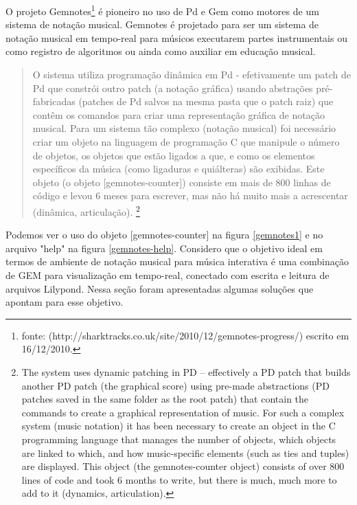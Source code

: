 \documentclass[draft]{ppgmus}
\begin{document}
O projeto Gemnotes\footnote{fonte: (http://sharktracks.co.uk/site/2010/12/gemnotes-progress/) escrito em 16/12/2010.} 
\cite{gemnotes} é pioneiro no uso de Pd e Gem como motores de um sistema de notação musical.
Gemnotes é projetado para ser um sistema de notação musical em tempo-real para músicos executarem partes instrumentais
ou como registro de algoritmos ou ainda como auxiliar em educação musical.

\begin{quote}
O sistema utiliza programação dinâmica em Pd - efetivamente um patch de Pd que constrói outro patch (a notação gráfica)
usando abstrações pré-fabricadas (patches de Pd salvos na mesma pasta que o patch raiz) que contêm os comandos para
criar uma representação gráfica de notação musical. Para um sistema tão complexo (notação musical) foi necessário
criar um objeto na linguagem de programação C que manipule o número de objetos, os objetos que estão ligados a que,
e como os elementos específicos da música (como ligaduras e quiálteras) são exibidas. Este objeto (o objeto [gemnotes-counter])
consiste em mais de 800 linhas de código e levou 6 meses para escrever, mas não há muito mais a acrescentar
(dinâmica, articulação). \cite{gemnotes} \footnote{The system uses dynamic patching in PD – effectively a PD patch that builds another PD patch (the graphical score) 
using pre-made abstractions (PD patches saved in the same folder as the root patch) that contain the commands to 
create a graphical representation of music. For such a complex system (music notation) it has been necessary to 
create an object in the C programming language that manages the number of objects, which objects are linked to which, 
and how music-specific elements (such as ties and tuples) are displayed. This object (the gemnotes-counter object) 
consists of over 800 lines of code and took 6 months to write, but there is much, much more to add to it 
(dynamics, articulation).}
\end{quote}


Podemos ver o uso do objeto [gemnotes-counter] na figura \ref{gemnotes1} e no arquivo "help" na figura \ref{gemnotes-help}.
Considero que o objetivo ideal em termos de ambiente de notação musical para música interativa é uma combinação de GEM para
visualização em tempo-real, conectado com escrita e leitura de arquivos Lilypond. Nessa seção foram apresentadas algumas
soluções que apontam para esse objetivo.
\end{document}
